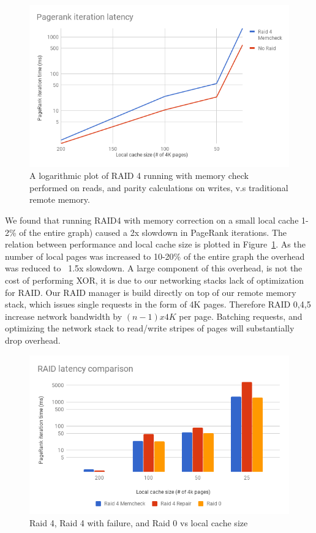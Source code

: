 \begin{figure}[H]
    \includegraphics[width=\columnwidth]{fig/Raid4Overhead}
    \caption{A logarithmic plot of RAID 4 running with memory check performed on reads, and parity calculations on writes, v.s traditional remote memory.}
    \label{fig:raid4Overhead}
\end{figure}

We found that running RAID4 with memory correction on a small local
cache 1-2\% of the entire graph) caused a 2x slowdown in PageRank
iterations. The relation between performance and local cache size is
plotted in Figure~\ref{fig:raid4Overhead}. As the number of local
pages was increased to 10-20\% of the entire graph the overhead was
reduced to ~1.5x slowdown. A large component of this overhead, is not
the cost of performing XOR, it is due to our networking stacks lack of
optimization for RAID. Our RAID manager is build directly on top of
our remote memory stack, which issues single requests in the form of 4K
pages. Therefore RAID 0,4,5 increase network bandwidth by $(n-1)x4K$
per page. Batching requests, and optimizing the network stack to
read/write stripes of pages will substantially drop overhead.

\begin{figure}[H]
    \includegraphics[width=\columnwidth]{fig/RaidComparison}
    \caption{Raid 4, Raid 4 with failure, and Raid 0 vs local cache size}
    \label{fig:RaidComparison}
\end{figure}

